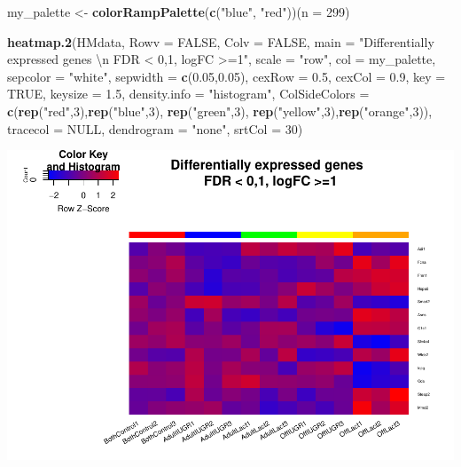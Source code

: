 \documentclass[]{article}
\newenvironment{Shaded}{\begin{snugshade}}{\end{snugshade}}
\newcommand{\KeywordTok}[1]{\textcolor[rgb]{0.13,0.29,0.53}{\textbf{#1}}}
\newcommand{\DataTypeTok}[1]{\textcolor[rgb]{0.13,0.29,0.53}{#1}}
\newcommand{\DecValTok}[1]{\textcolor[rgb]{0.00,0.00,0.81}{#1}}
\newcommand{\FloatTok}[1]{\textcolor[rgb]{0.00,0.00,0.81}{#1}}
\newcommand{\CharTok}[1]{\textcolor[rgb]{0.31,0.60,0.02}{#1}}
\newcommand{\StringTok}[1]{\textcolor[rgb]{0.31,0.60,0.02}{#1}}
\newcommand{\OtherTok}[1]{\textcolor[rgb]{0.56,0.35,0.01}{#1}}
\newcommand{\NormalTok}[1]{#1}
\begin{document}
\begin{Shaded}
\begin{Highlighting}[]
\NormalTok{my_palette <-}\StringTok{ }\KeywordTok{colorRampPalette}\NormalTok{(}\KeywordTok{c}\NormalTok{(}\StringTok{"blue"}\NormalTok{, }\StringTok{"red"}\NormalTok{))(}\DataTypeTok{n =} \DecValTok{299}\NormalTok{)}
 
\KeywordTok{heatmap.2}\NormalTok{(HMdata,}
\DataTypeTok{Rowv =} \OtherTok{FALSE}\NormalTok{,}
\DataTypeTok{Colv =} \OtherTok{FALSE}\NormalTok{,}
\DataTypeTok{main =} \StringTok{"Differentially expressed genes }\CharTok{\textbackslash{}n}\StringTok{ FDR < 0,1, logFC >=1"}\NormalTok{,}
\DataTypeTok{scale =} \StringTok{"row"}\NormalTok{,}
\DataTypeTok{col =}\NormalTok{ my_palette,}
\DataTypeTok{sepcolor =} \StringTok{"white"}\NormalTok{,}
\DataTypeTok{sepwidth =} \KeywordTok{c}\NormalTok{(}\FloatTok{0.05}\NormalTok{,}\FloatTok{0.05}\NormalTok{),}
\DataTypeTok{cexRow =} \FloatTok{0.5}\NormalTok{,}
\DataTypeTok{cexCol =} \FloatTok{0.9}\NormalTok{,}
\DataTypeTok{key =} \OtherTok{TRUE}\NormalTok{,}
\DataTypeTok{keysize =} \FloatTok{1.5}\NormalTok{,}
\DataTypeTok{density.info =} \StringTok{"histogram"}\NormalTok{,}
\DataTypeTok{ColSideColors =} \KeywordTok{c}\NormalTok{(}\KeywordTok{rep}\NormalTok{(}\StringTok{"red"}\NormalTok{,}\DecValTok{3}\NormalTok{),}\KeywordTok{rep}\NormalTok{(}\StringTok{"blue"}\NormalTok{,}\DecValTok{3}\NormalTok{), }\KeywordTok{rep}\NormalTok{(}\StringTok{"green"}\NormalTok{,}\DecValTok{3}\NormalTok{), }\KeywordTok{rep}\NormalTok{(}\StringTok{"yellow"}\NormalTok{,}\DecValTok{3}\NormalTok{),}\KeywordTok{rep}\NormalTok{(}\StringTok{"orange"}\NormalTok{,}\DecValTok{3}\NormalTok{)),}
\DataTypeTok{tracecol =} \OtherTok{NULL}\NormalTok{,}
\DataTypeTok{dendrogram =} \StringTok{"none"}\NormalTok{,}
\DataTypeTok{srtCol =} \DecValTok{30}\NormalTok{)}
\end{Highlighting}
\end{Shaded}

\includegraphics{delVal_AnaIsabel_ADO_PEC1_files/figure-latex/unnamed-chunk-54-1.pdf}
\end{document}
